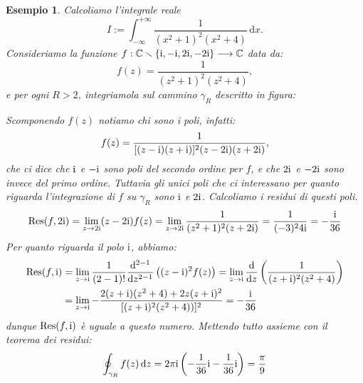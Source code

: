 \documentclass[11pt]{book}
\theoremstyle{Definizione}
\theoremstyle{TeoremaProposizioneLemmaCorollarioCongettura}
\theoremstyle{OsservazioneNotaEsempio}
\newtheorem{myes}{Esempio}[section]
\newcommand{\R}{\mathbb{R}}
\newcommand{\C}{\mathbb{C}}
\newcommand{\tolto}{\smallsetminus}
\renewcommand{\i}{\textup{i}}
\renewcommand{\d}{\mathrm{d}}
\newcommand{\dz}{\,\d z}
\newcommand{\dx}{\,\d x}
\newcommand{\Res}{\textup{Res}}
\newcommand{\frecciaIn}{
\tikz \draw[-latex] (-1pt,0) -- (1pt,0);
}
\newcommand{\frecciaOut}{
\tikz \draw[latex-] (-1pt,0) -- (1pt,0);
}
\begin{document}
\begin{myes}\label{es:Esempio3TeoremaDeiResidui}
Calcoliamo l'integrale reale
$$
I := \int_{-\infty}^{+\infty} \frac{1}{(x^2+1)^2(x^2+4)}\dx.
$$
Consideriamo la funzione $f: \C \tolto \{\i,-\i,2\i,-2\i\} \longrightarrow \C$ data da:
$$
f(z) = \frac{1}{(z^2+1)^2(z^2+4)},
$$
e per ogni $R > 2$, integriamola sul cammino $\gamma_R$ descritto in figura:
\begin{center}
\end{center}
Scomponendo $f(z)$ notiamo chi sono i poli, infatti:
$$
f(z) = \frac{1}{[(z-\i)(z+\i)]^2(z-2\i)(z+2\i)},
$$
che ci dice che $\i$ e $-\i$ sono poli del secondo ordine per $f$, e che $2\i$ e $-2\i$ sono invece del primo ordine. Tuttavia gli unici poli che ci interessano per quanto riguarda l'integrazione di $f$ su $\gamma_R$ sono $\i$ e $2\i$. Calcoliamo i residui di questi poli.
$$
\Res(f,2\i) = \lim_{z \to 2\i} (z-2\i) f(z) = \lim_{z \to 2\i} \frac{1}{(z^2+1)^2(z+2\i)} = \frac{1}{(-3)^24\i} = -\frac{\i}{36}
$$
Per quanto riguarda il polo $\i$, abbiamo:
\begin{align*}
\Res(f,\i) &= \lim_{z \to \i} \frac{1}{(2-1)!} \frac{\d^{2-1}}{\d z^{2-1}} \left((z-\i)^2 f(z) \right) = \lim_{z \to \i} \frac{\d}{\d z} \left(\frac{1}{(z+\i)^2(z^2+4)}\right)\\
&= \lim_{z \to \i} -\frac{2(z+\i)(z^2+4)+ 2z(z+\i)^2}{[(z+\i)^2(z^2+4))]^2} = -\frac{\i}{36}
\end{align*}
dunque $\Res(f,\i)$ è uguale a questo numero. Mettendo tutto assieme con il teorema dei residui:
$$
\oint_{\gamma_R} f(z)\dz = 2\pi\i\left(-\frac{1}{36}\i-\frac{1}{36}\i\right) = \frac{\pi}{9}
$$
\end{myes}
\end{document}
